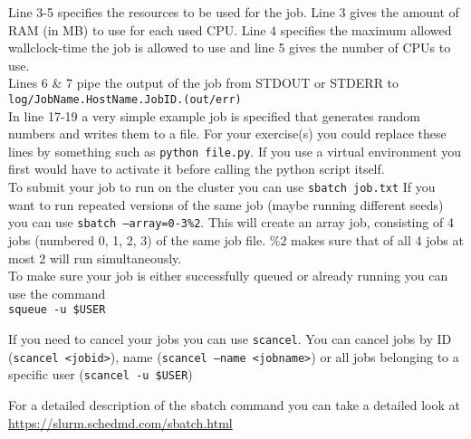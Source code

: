 \documentclass{exam}
\begin{document}
	\noindent
	Line 3-5 specifies the resources to be used for the job. Line 3 gives the amount of RAM (in MB) to use for each used CPU. Line 4 specifies the maximum
	allowed wallclock-time the job is allowed to use and line 5 gives the number of CPUs to use.\\
	
	\noindent
	Lines 6 \& 7 pipe the output of the job from STDOUT or STDERR to \texttt{log/JobName.HostName.JobID.(out/err)}\\
	
	\noindent
	In line 17-19 a very simple example job is specified that generates random numbers and writes them to a file. For your exercise(s) you could replace these lines
	by something such as \texttt{python file.py}. If you use a virtual environment you first would have to activate it before calling the python script itself.\\
	
	\noindent
	To submit your job to run on the cluster you can use \texttt{sbatch job.txt}
	If you want to run repeated versions of the same job (maybe running different seeds) you can use \texttt{sbatch --array=0-3\%2}. This will create an array job, consisting
	of 4 jobs (numbered 0, 1, 2, 3) of the same job file. \%2 makes sure that of all 4 jobs at most 2 will run simultaneously.\\
	
	\noindent
	To make sure your job is either successfully queued or already running you can use the command\\ \texttt{squeue -u \$USER}
	
	\noindent
	If you need to cancel your jobs you can use \texttt{scancel}. You can cancel jobs by ID (\texttt{scancel <jobid>}), name (\texttt{scancel --name <jobname>}) or all jobs belonging to a specific user (\texttt{scancel -u \$USER})
	
	\noindent
	For a detailed description of the sbatch command you can take a detailed look at \url{https://slurm.schedmd.com/sbatch.html}
	
\end{document}
